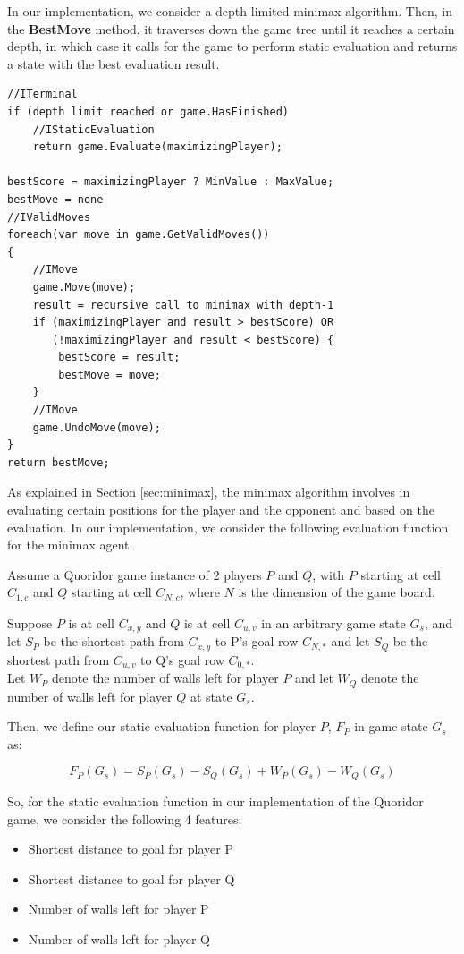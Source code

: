 In our implementation, we consider a depth limited minimax algorithm.
Then, in the \textbf{BestMove} method, it traverses down the game tree until it reaches a certain depth, in which case it calls for the game to perform static evaluation and returns a state with the best evaluation result.
\begin{lstlisting}
//ITerminal
if (depth limit reached or game.HasFinished)
    //IStaticEvaluation
    return game.Evaluate(maximizingPlayer);

bestScore = maximizingPlayer ? MinValue : MaxValue;
bestMove = none
//IValidMoves
foreach(var move in game.GetValidMoves())
{
    //IMove
    game.Move(move);
    result = recursive call to minimax with depth-1
    if (maximizingPlayer and result > bestScore) OR
       (!maximizingPlayer and result < bestScore) {
        bestScore = result;
        bestMove = move;
    }
    //IMove
    game.UndoMove(move);
}
return bestMove;
\end{lstlisting}

As explained in Section \ref{sec:minimax}, the minimax algorithm involves in evaluating certain positions for the player and the opponent and based on the evaluation. In our implementation, we consider the following evaluation function for the minimax agent.

Assume a Quoridor game instance of 2 players $P$ and $Q$, with $P$ starting at cell $C_{1,c}$ and $Q$ starting at cell $C_{N,c}$, where $N$ is the dimension of the game board.

Suppose $P$ is at cell $C_{x,y}$ and $Q$ is at cell $C_{u,v}$ in an arbitrary game state $G_s$, and let $S_P$ be the shortest path from $C_{x,y}$ to P's goal row $C_{N,*}$ and let $S_Q$ be the shortest path from $C_{u,v}$ to Q's goal row $C_{0,*}$.\\
Let $W_P$ denote the number of walls left for player $P$ and let $W_Q$ denote the number of walls left for player $Q$ at state $G_s$.

Then, we define our static evaluation function for player $P$, $F_P$ in game state $G_s$ as:

\begin{equation}
    F_P(G_s) = S_P(G_s) - S_Q(G_s) + W_P(G_s) - W_Q(G_s)
\end{equation}

So, for the static evaluation function in our implementation of the Quoridor game, we consider the following 4 features:
\begin{itemize}
    \item Shortest distance to goal for player P
    \item Shortest distance to goal for player Q
    \item Number of walls left for player P
    \item Number of walls left for player Q
\end{itemize}
 

